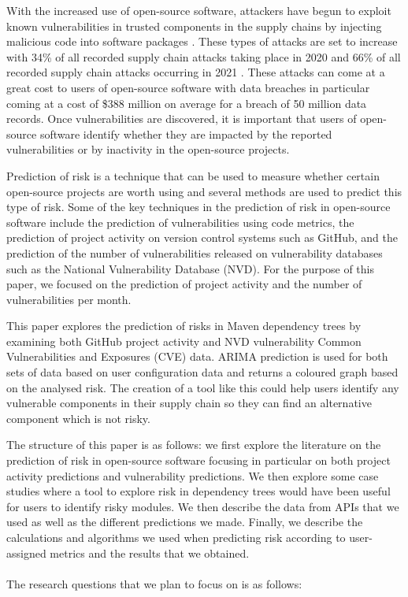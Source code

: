 \documentclass[conference]{IEEEtran}
\begin{document}
With the increased use of open-source software, attackers have begun to exploit known vulnerabilities in trusted components in the supply chains by injecting malicious code into software packages \cite{ohm_backstabbers_2020}. These types of attacks are set to increase with 34\% of all recorded supply chain attacks taking place in 2020 and 66\% of all recorded supply chain attacks occurring in 2021 \cite{m_z_malik_protection_2023}. These attacks can come at a great cost to users of open-source software with data breaches in particular coming at a cost of \$388 million on average for a breach of 50 million data records\cite{x_wang_feasibility_2021}. Once vulnerabilities are discovered, it is important that users of open-source software identify whether they are impacted by the reported vulnerabilities or by inactivity in the open-source projects. 

Prediction of risk is a technique that can be used to measure whether certain open-source projects are worth using and several methods are used to predict this type of risk. Some of the key techniques in the prediction of risk in open-source software include the prediction of vulnerabilities using code metrics, the prediction of project activity on version control systems such as GitHub, and the prediction of the number of vulnerabilities released on vulnerability databases such as the National Vulnerability Database (NVD). For the purpose of this paper, we focused on the prediction of project activity and the number of vulnerabilities per month. 

This paper explores the prediction of risks in Maven dependency trees by examining both GitHub project activity and NVD vulnerability Common Vulnerabilities and Exposures (CVE) data. ARIMA prediction is used for both sets of data based on user configuration data and returns a coloured graph based on the analysed risk. The creation of a tool like this could help users identify any vulnerable components in their supply chain so they can find an alternative component which is not risky. 

The structure of this paper is as follows: we first explore the literature on the prediction of risk in open-source software focusing in particular on both project activity predictions and vulnerability predictions. We then explore some case studies where a tool to explore risk in dependency trees would have been useful for users to identify risky modules. We then describe the data from APIs that we used as well as the different predictions we made. Finally, we describe the calculations and algorithms we used when predicting risk according to user-assigned metrics and the results that we obtained. 
\\\\
The research questions that we plan to focus on is as follows:\\
\end{document}
